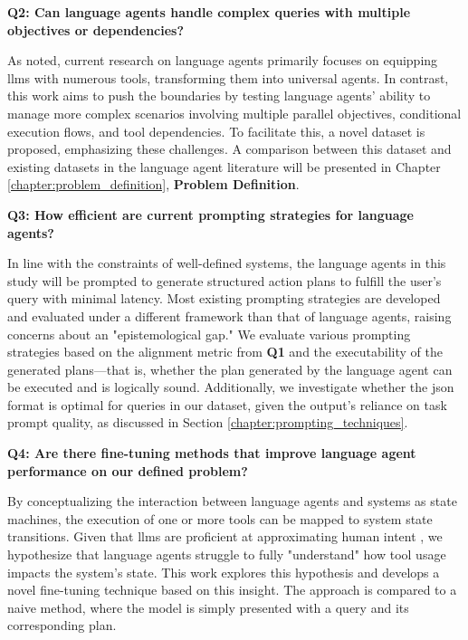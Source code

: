 \pskip

\textbf{Q2: Can language agents handle complex queries with multiple objectives or dependencies?}

\vskip 0.1in

As noted, current research on language agents primarily focuses on equipping \glspl{llm} with numerous tools, transforming them into universal agents. In contrast, this work aims to push the boundaries by testing language agents' ability to manage more complex scenarios involving multiple parallel objectives, conditional execution flows, and tool dependencies. To facilitate this, a novel dataset is proposed, emphasizing these challenges. A comparison between this dataset and existing datasets in the language agent literature will be presented in Chapter \ref{chapter:problem_definition}, \textbf{Problem Definition}.

\pskip

\textbf{Q3: How efficient are current prompting strategies for language agents?}

\vskip 0.1in

In line with the constraints of well-defined systems, the language agents in this study will be prompted to generate structured action plans to fulfill the user's query with minimal latency. Most existing prompting strategies are developed and evaluated under a different framework than that of language agents, raising concerns about an "epistemological gap." We evaluate various prompting strategies based on the alignment metric from \textbf{Q1} and the executability of the generated plans—that is, whether the plan generated by the language agent can be executed and is logically sound. Additionally, we investigate whether the \gls{json} format is optimal for queries in our dataset, given the output's reliance on task prompt quality, as discussed in Section \ref{chapter:prompting_techniques}.

\pskip

\textbf{Q4: Are there fine-tuning methods that improve language agent performance on our defined problem?}

\vskip 0.1in

By conceptualizing the interaction between language agents and systems as state machines, the execution of one or more tools can be mapped to system state transitions. Given that \glspl{llm} are proficient at approximating human intent \cite{zheng2023judgingllmasajudgemtbenchchatbot}, we hypothesize that language agents struggle to fully "understand" how tool usage impacts the system's state. This work explores this hypothesis and develops a novel fine-tuning technique based on this insight. The approach is compared to a naive method, where the model is simply presented with a query and its corresponding plan.

